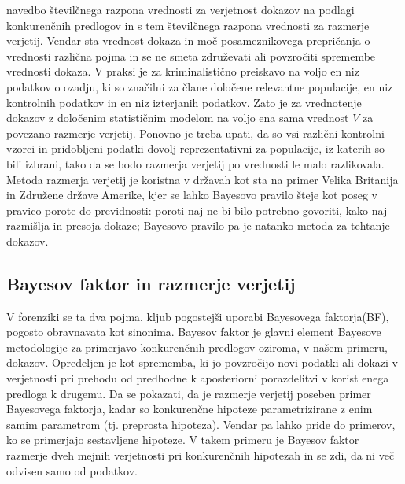 \documentclass[fin1, tisk]{fmfdelo}
\theoremstyle{definition}
\theoremstyle{trditev}
\theoremstyle{izrek}
\begin{document}
navedbo številčnega razpona vrednosti za verjetnost dokazov na podlagi konkurenčnih predlogov in s tem številčnega razpona vrednosti za razmerje verjetij.
Vendar sta vrednost dokaza in moč posameznikovega prepričanja o vrednosti različna pojma in se ne smeta združevati ali povzročiti spremembe
vrednosti dokaza. V praksi je za kriminalistično preiskavo na voljo en niz
podatkov o ozadju, ki so značilni za člane določene relevantne populacije, en niz kontrolnih podatkov in en niz izterjanih podatkov. Zato je za vrednotenje
dokazov z določenim statističnim modelom na voljo ena sama vrednost $V$ za povezano razmerje verjetij. Ponovno je treba upati, da so vsi različni kontrolni
vzorci in pridobljeni podatki dovolj reprezentativni za populacije, iz katerih so bili izbrani, tako da se bodo razmerja verjetij po vrednosti le malo
razlikovala.\\
Metoda razmerja verjetij je koristna v državah kot sta na primer Velika Britanija in 
Združene države Amerike, kjer se lahko Bayesovo pravilo šteje kot poseg v pravico porote do previdnosti: poroti naj ne bi bilo potrebno govoriti, 
kako naj razmišlja in presoja dokaze; Bayesovo pravilo pa je natanko metoda za tehtanje dokazov.

\subsection{Bayesov faktor in razmerje verjetij}
V forenziki se ta dva pojma, kljub pogostejši uporabi Bayesovega faktorja(BF), pogosto obravnavata kot sinonima. Bayesov faktor je glavni
element Bayesove metodologije za primerjavo konkurenčnih predlogov oziroma, v našem primeru, dokazov. Opredeljen je kot sprememba, ki jo 
povzročijo novi podatki ali dokazi v verjetnosti pri prehodu od predhodne k aposteriorni porazdelitvi v korist enega predloga k drugemu. Da se 
pokazati, da je razmerje verjetij poseben primer Bayesovega faktorja, kadar so konkurenčne hipoteze parametrizirane z enim samim parametrom 
(tj. preprosta hipoteza). Vendar pa lahko pride do primerov, ko se primerjajo sestavljene hipoteze. V takem primeru je Bayesov faktor razmerje dveh 
mejnih verjetnosti pri konkurenčnih hipotezah in se zdi, da ni več odvisen samo od podatkov. 
\end{document}
